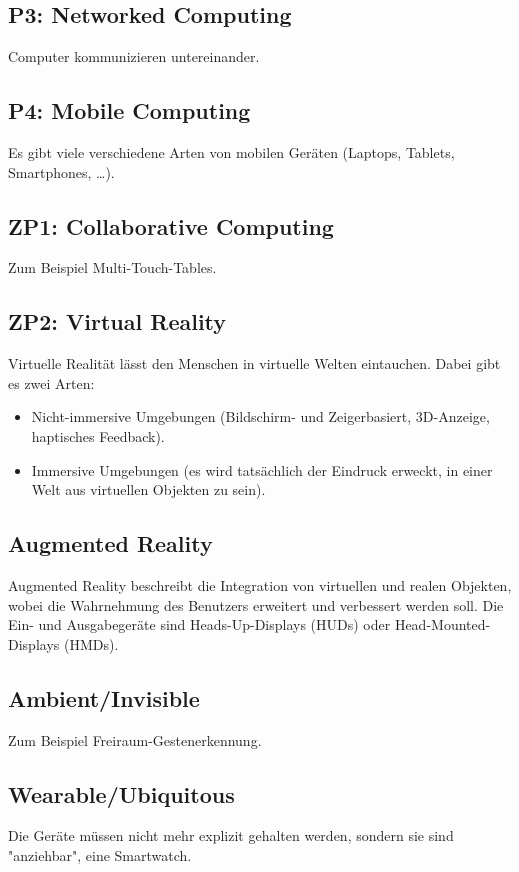 			\subsection{P3: Networked Computing}
				Computer kommunizieren untereinander.

			\subsection{P4: Mobile Computing}
				Es gibt viele verschiedene Arten von mobilen Geräten (Laptops, Tablets, Smartphones, \dots).

			\subsection{ZP1: Collaborative Computing}
				Zum Beispiel Multi-Touch-Tables.

			\subsection{ZP2: Virtual Reality}
				Virtuelle Realität lässt den Menschen in virtuelle Welten eintauchen. Dabei gibt es zwei Arten:
				\begin{itemize}
					\item Nicht-immersive Umgebungen (Bildschirm- und Zeigerbasiert, 3D-Anzeige, \mglw haptisches Feedback).
					\item Immersive Umgebungen (es wird tatsächlich der Eindruck erweckt, in einer Welt aus virtuellen Objekten zu sein).
				\end{itemize}

			\subsection{Augmented Reality}
				Augmented Reality beschreibt die Integration von virtuellen und realen Objekten, wobei die Wahrnehmung des Benutzers erweitert und verbessert werden soll. Die Ein- und Ausgabegeräte sind \zB Heads-Up-Displays (HUDs) oder Head-Mounted-Displays (HMDs).

			\subsection{Ambient/Invisible}
				Zum Beispiel Freiraum-Gestenerkennung.

			\subsection{Wearable/Ubiquitous}
				Die Geräte müssen nicht mehr explizit gehalten werden, sondern sie sind "anziehbar", \zB eine Smartwatch.

